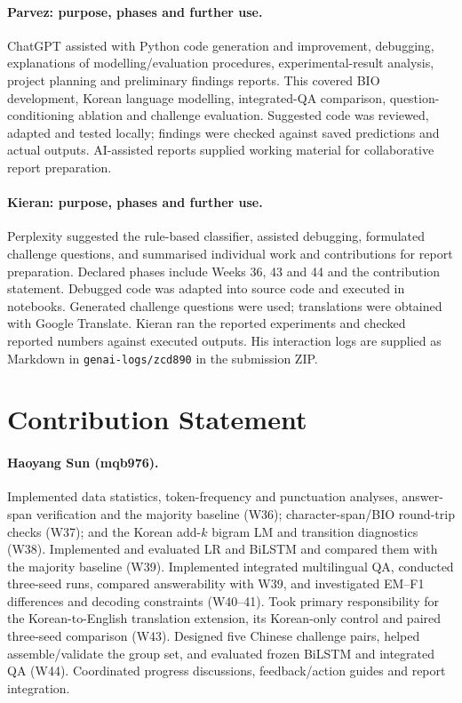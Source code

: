 \documentclass[11pt]{article}
\begin{document}
\paragraph{Parvez: purpose, phases and further use.}
ChatGPT assisted with Python code generation and improvement, debugging, explanations of modelling/evaluation procedures, experimental-result analysis, project planning and preliminary findings reports. This covered BIO development, Korean language modelling, integrated-QA comparison, question-conditioning ablation and challenge evaluation. Suggested code was reviewed, adapted and tested locally; findings were checked against saved predictions and actual outputs. AI-assisted reports supplied working material for collaborative report preparation.

\paragraph{Kieran: purpose, phases and further use.}
Perplexity suggested the rule-based classifier, assisted debugging, formulated challenge questions, and summarised individual work and contributions for report preparation. Declared phases include Weeks 36, 43 and 44 and the contribution statement. Debugged code was adapted into source code and executed in notebooks. Generated challenge questions were used; translations were obtained with Google Translate. Kieran ran the reported experiments and checked reported numbers against executed outputs. His interaction logs are supplied as Markdown in \texttt{genai-logs/zcd890} in the submission ZIP.

\section{Contribution Statement}
\paragraph{Haoyang Sun (mqb976).}
Implemented data statistics, token-frequency and punctuation analyses, answer-span verification and the majority baseline (W36); character-span/BIO round-trip checks (W37); and the Korean add-$k$ bigram LM and transition diagnostics (W38). Implemented and evaluated LR and BiLSTM and compared them with the majority baseline (W39). Implemented integrated multilingual QA, conducted three-seed runs, compared answerability with W39, and investigated EM--F1 differences and decoding constraints (W40--41). Took primary responsibility for the Korean-to-English translation extension, its Korean-only control and paired three-seed comparison (W43). Designed five Chinese challenge pairs, helped assemble/validate the group set, and evaluated frozen BiLSTM and integrated QA (W44). Coordinated progress discussions, feedback/action guides and report integration.
\end{document}
